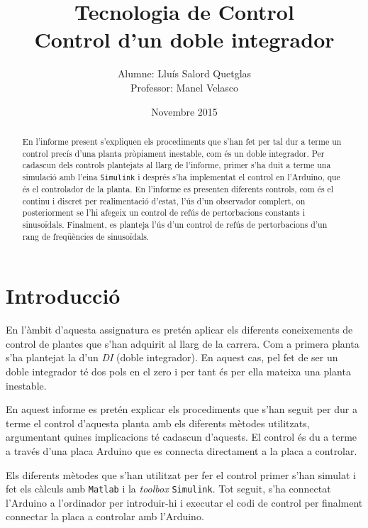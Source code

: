 \documentclass[12pt,a4paper,final,twoside,openright]{report}
\title{Tecnologia de Control \\ Control d'un doble integrador}
\author{Alumne: Lluís Salord Quetglas \\ Professor: Manel Velasco}
\date{Novembre 2015}
\begin{document}
\maketitle
\thispagestyle{empty}

\cleardoublepage

\setcounter{page}{1} %

\begin{abstract}

En l'informe present s'expliquen els procediments que s'han fet per tal dur a terme un control precís d'una planta pròpiament inestable, com és un doble integrador. Per cadascun dels controls plantejats al llarg de l'informe, primer s'ha duit a terme una simulació amb l'eina \texttt{Simulink} i després s'ha implementat el control en l'Arduino, que és el controlador de la planta. En l'informe es presenten diferents controls, com és el continu i discret per realimentació d'estat, l'ús d'un observador complert, on posteriorment se l'hi afegeix un control de refús de pertorbacions constants i sinusoïdals. Finalment, es planteja l'ús d'un control de refús de pertorbacions d'un rang de freqüències de sinusoïdals.

\end{abstract}

\tableofcontents

\listoffigures

\listoftables

\chapter{Introducció}

En l'àmbit d'aquesta assignatura es pretén aplicar els diferents coneixements de control de plantes que s'han adquirit al llarg de la carrera. Com a primera planta s'ha plantejat la d'un \textit{DI} (doble integrador). En aquest cas, pel fet de ser un doble integrador té dos pols en el zero i per tant és per ella mateixa una planta inestable.

En aquest informe es pretén explicar els procediments que s'han seguit per dur a terme el control d'aquesta planta amb els diferents mètodes utilitzats, argumentant quines implicacions té cadascun d'aquests. El control és du a terme a través d'una placa Arduino que es connecta directament a la placa a controlar.

Els diferents mètodes que s'han utilitzat per fer el control primer s'han simulat i fet els càlculs amb \texttt{Matlab} i la \textit{toolbox} \texttt{Simulink}. Tot seguit, s'ha connectat l'Arduino a l'ordinador per introduir-hi i executar el codi de control per finalment connectar la placa a controlar amb l'Arduino.
\end{document}
